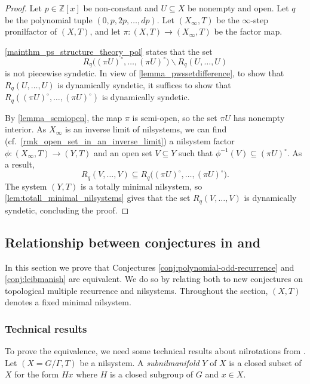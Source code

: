 \documentclass{article}
\theoremstyle{plain}
\theoremstyle{claim}
\theoremstyle{definition}
\theoremstyle{plain}
\theoremstyle{plain}
\newcommand{\Z}{\mathbb{Z}}
\renewcommand{\setminus}{\backslash}
\newcommand{\1}{\boldsymbol{1}}
\begin{document}
\begin{proof}
Let $p \in \Z[x]$ be non-constant and $U \subseteq X$ be nonempty and open.  Let $q$ be the polynomial tuple $(0, p, 2p, \ldots, dp)$.
Let $(X_{\infty}, T)$ be the $\infty$-step pronilfactor of $(X, T)$, and let $\pi: (X, T) \to (X_{\infty}, T)$ be the factor map. 

\cref{mainthm_ps_structure_theory_pol} states that the set
\[
    R_q\big((\pi U)^\circ, \ldots, (\pi U)^\circ\big) \setminus R_q(U, \ldots, U) 
\]
is not piecewise syndetic. 
In view of \cref{lemma_pwssetdifference}, to show that $R_q(U, \ldots, U)$ is dynamically syndetic, it suffices to show that $R_q((\pi U)^\circ, \ldots, (\pi U)^\circ)$ is dynamically syndetic.

 
By \cref{lemma_semiopen}, the map $\pi$ is semi-open, so the set $\pi U$ has nonempty interior.
As $X_\infty$ is an inverse limit of nilsystems, we can find (cf.\ \cref{rmk_open_set_in_an_inverse_limit}) a nilsystem factor $\phi : (X_\infty, T) \to (Y,T)$ and an open set $V \subseteq Y$ such that $\phi^{-1}(V) \subseteq (\pi U)^\circ$.
As a result,
\[
    R_q(V, \ldots, V) \subseteq R_q\big((\pi U)^\circ, \ldots, (\pi U)^\circ\big).
\]
The system $(Y,T)$ is a totally minimal nilsystem, so \cref{lem:totall_minimal_nilsystems} gives that the set $R_q(V, \ldots, V)$ is dynamically syndetic, concluding the proof.
\end{proof}






\subsection{Relationship between conjectures in \texorpdfstring{\cite{glasner_huang_shao_weiss_ye_2020}}{[5]} and \texorpdfstring{\cite{Leibman05b}}{[11]}}

In this section we prove that Conjectures \ref{conj:polynomial-odd-recurrence} and \ref{conj:leibmanish} are equivalent. We do so by relating both to new conjectures on topological multiple recurrence and nilsystems.
Throughout the section, $(X,T)$ denotes a fixed minimal nilsystem.


\subsubsection{Technical results}



To prove the equivalence, we need some technical results about nilrotations from \cite{Leibman07}. 
Let $(X = G/\Gamma, T)$ be a nilsystem. A \emph{subnilmanifold} $Y$ of $X$ is a closed subset of $X$ for the form $H x$ where $H$ is a closed subgroup of $G$ and $x \in X$. 
\end{document}
